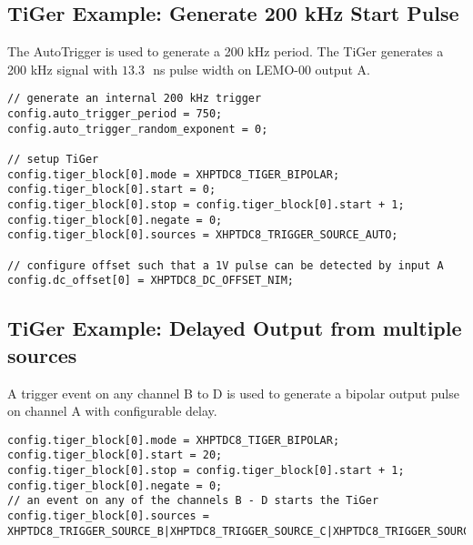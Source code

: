 \newpage
\subsection{TiGer Example: Generate 200 kHz Start Pulse}
The AutoTrigger is used to generate a 200 kHz period. 
The TiGer generates a 200 kHz signal with $13.3$\,~ns pulse width on LEMO-00
output A.

\begin{lstlisting}
// generate an internal 200 kHz trigger
config.auto_trigger_period = 750;
config.auto_trigger_random_exponent = 0;

// setup TiGer 
config.tiger_block[0].mode = XHPTDC8_TIGER_BIPOLAR;
config.tiger_block[0].start = 0;
config.tiger_block[0].stop = config.tiger_block[0].start + 1;
config.tiger_block[0].negate = 0;
config.tiger_block[0].sources = XHPTDC8_TRIGGER_SOURCE_AUTO;

// configure offset such that a 1V pulse can be detected by input A 
config.dc_offset[0] = XHPTDC8_DC_OFFSET_NIM; 
\end{lstlisting}

\subsection{TiGer Example: Delayed Output from multiple sources}
A trigger event on any channel B to D is used to generate a bipolar output
pulse on channel A with configurable delay. 
\begin{lstlisting}
config.tiger_block[0].mode = XHPTDC8_TIGER_BIPOLAR;
config.tiger_block[0].start = 20;
config.tiger_block[0].stop = config.tiger_block[0].start + 1;
config.tiger_block[0].negate = 0;
// an event on any of the channels B - D starts the TiGer 
config.tiger_block[0].sources = XHPTDC8_TRIGGER_SOURCE_B|XHPTDC8_TRIGGER_SOURCE_C|XHPTDC8_TRIGGER_SOURCE_D;
\end{lstlisting}
